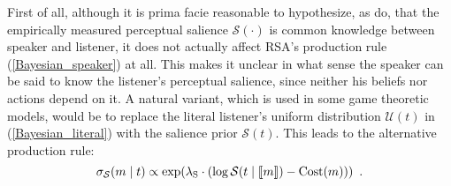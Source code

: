 First of all, although it is prima facie reasonable to hypothesize, as
\cite{Frank} do, that the empirically measured perceptual salience
$\mathcal{S}(\cdot)$ is common knowledge between speaker and listener,
it does not actually affect RSA's production rule
(\ref{Bayesian_speaker}) at all. This makes it unclear in what sense
the speaker can be said to know the listener's perceptual salience,
since neither his beliefs nor actions depend on it. A natural variant,
which is used in some game theoretic models, would be to replace the literal
listener's uniform distribution $\mathcal{U}(t)$ in
(\ref{Bayesian_literal}) with the salience prior
$\mathcal{S}(t)$. This leads to the alternative production rule:
\begin{equation} \label{Bayesian_speaker_salience}
\sigma_\mathcal{S}(m \mid t) \propto \exp(\lambda_\mathrm{S} \cdot (\log \mathcal{S}(t\mid \llbracket m \rrbracket)-\mbox{Cost}(m))) \enspace .
\end{equation}


